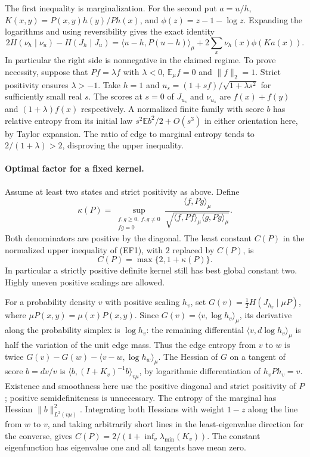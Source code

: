 The first inequality is marginalization. For the second put $a=u/h$,
$K(x,y)=P(x,y)h(y)/Ph(x)$, and $\phi(z)=z-1-\log z$.
Expanding the logarithms and using reversibility gives the exact identity
\[
  2H(\nu_h\mid\nu_u)-H(J_h\mid J_u)=
  \langle u-h,P(u-h)\rangle_\mu+2\sum_x\nu_h(x)\phi(Ka(x)).  \tag{EF2}
\]
In particular the right side is nonnegative in the claimed regime.
To prove necessity, suppose that $P f=\lambda f$ with $\lambda<0$,
$\mathbb E_\mu f=0$ and $\|f\|_2=1$. Strict positivity ensures $\lambda>-1$.
Take $h=1$ and $u_s=(1+sf)/\sqrt{1+\lambda s^2}$ for sufficiently small
real $s$. The scores at $s=0$ of $J_{u_s}$ and $\nu_{u_s}$ are
$f(x)+f(y)$ and $(1+\lambda)f(x)$ respectively. A normalized finite
family with score $b$ has relative entropy from its initial law
$s^2\mathbb E b^2/2+O(s^3)$ in either orientation here, by Taylor
expansion. The ratio of edge to marginal entropy tends to
$2/(1+\lambda)>2$, disproving the upper inequality.

\paragraph{Optimal factor for a fixed kernel.}
Assume at least two states and strict positivity as above. Define
\[
 \kappa(P)=\sup_{\substack{f,g\ge0,\ f,g\ne0\\ f g=0}}
 \frac{\langle f,Pg\rangle_\mu}
 {\sqrt{\langle f,Pf\rangle_\mu\langle g,Pg\rangle_\mu}} .
\]
Both denominators are positive by the diagonal. The least constant
$C(P)$ in the normalized upper inequality of (EF1), with $2$ replaced
by $C(P)$, is
\[
                   C(P)=\max\{2,1+\kappa(P)\}.               \tag{EF5}
\]
In particular a strictly positive definite kernel still has best
global constant two. Highly uneven positive scalings are allowed.

For a probability density $v$ with positive scaling $h_v$, set
$G(v)=\frac12 H(J_{h_v}\mid\mu P)$, where $\mu P(x,y)=\mu(x)P(x,y)$.
Since $G(v)=\langle v,\log h_v\rangle_\mu$, its derivative along
the probability simplex is $\log h_v$: the remaining differential
$\langle v,d\log h_v\rangle_\mu$ is half the variation of the unit
edge mass. Thus the edge entropy from $v$ to $w$ is twice
$G(v)-G(w)-\langle v-w,\log h_w\rangle_\mu$.
The Hessian of $G$ on a tangent of score $b=dv/v$ is
$\langle b,(I+K_v)^{-1}b\rangle_{v\mu}$, by logarithmic
differentiation of $h_v Ph_v=v$. Existence and smoothness here use the
positive diagonal and strict positivity of $P$; positive semidefiniteness
is unnecessary. The entropy of the marginal has Hessian
$\|b\|_{L^2(v\mu)}^2$. Integrating both Hessians with weight $1-z$
along the line from $w$ to $v$, and taking arbitrarily short lines
in the least-eigenvalue direction for the converse, gives
$C(P)=2/(1+\inf_v\lambda_{\min}(K_v))$. The constant eigenfunction has
eigenvalue one and all tangents have mean zero.

